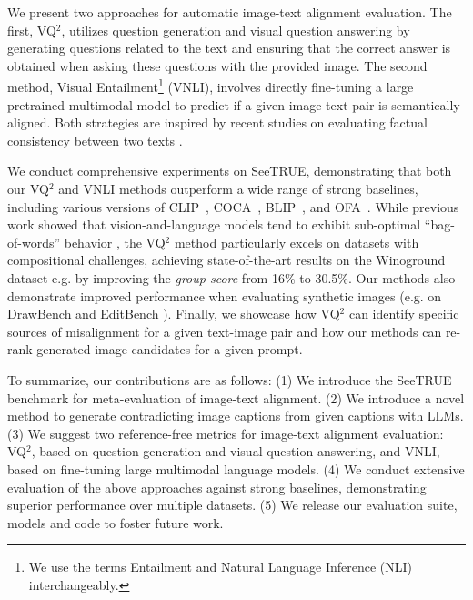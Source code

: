 \documentclass{article}
\newcommand{\datasetname}[0]{SeeTRUE\xspace}
\newcommand{\VQSQR}[0]{VQ$^2$\xspace}
\begin{document}
We present two approaches for automatic image-text alignment evaluation. The first, \VQSQR, utilizes question generation and visual question answering by generating questions related to the text \citep{changpinyo2022all} and ensuring that the correct answer is obtained when asking these questions with the provided image. The second method, Visual Entailment\footnote{We use the terms Entailment and Natural Language Inference (NLI) interchangeably.}  (VNLI), involves directly fine-tuning a large pretrained multimodal model to predict if a given image-text pair is semantically aligned. Both strategies are inspired by recent studies on evaluating factual consistency between two texts \citep{honovich2021q, honovich-etal-2022-true-evaluating, summac_laban_2022, tang2022understanding}.

We conduct comprehensive experiments on \datasetname, demonstrating that both our \VQSQR and VNLI methods outperform a wide range of strong baselines, including various versions of CLIP~\citep{radford2021learning}, COCA~\citep{yu2022coca}, BLIP~\citep{li2022blip,li2023blip}, and OFA~\citep{wang2022ofa}. While previous work showed that vision-and-language models tend to exhibit sub-optimal ``bag-of-words'' behavior \citep{yuksekgonul2022and}, the \VQSQR method particularly excels on datasets with compositional challenges, achieving state-of-the-art results on the Winoground dataset \citep{thrush2022winoground} e.g. by improving the \emph{group score} from 16\% to 30.5\%. Our methods also demonstrate improved performance when evaluating synthetic images (e.g. on DrawBench \cite{saharia2022photorealistic} and EditBench \cite{wang2022imagen}). Finally, we showcase how \VQSQR can identify specific sources of misalignment for a given text-image pair and how our methods can re-rank generated image candidates for a given prompt.

To summarize, our contributions are as follows: (1) We introduce the \datasetname benchmark for meta-evaluation of image-text alignment. (2) We introduce a novel method to generate contradicting image captions from given captions with LLMs. (3) We suggest two reference-free metrics for image-text alignment evaluation: \VQSQR, based on question generation and visual question answering, and VNLI, based on fine-tuning large multimodal language models. (4) We conduct extensive evaluation of the above approaches against strong baselines, demonstrating superior performance over multiple datasets. (5) We release our evaluation suite, models and code to foster future work.
 
\end{document}
